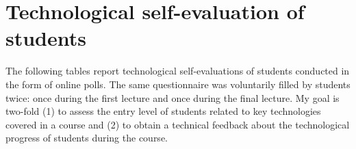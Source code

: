 \chapter{Technological self-evaluation of students}
\label{sec:tech-self-eval}

The following tables report technological self-evaluations of students conducted in the form of online polls. The same questionnaire was voluntarily filled by students twice: once during the first lecture and once during the final lecture. My goal is two-fold (1) to assess the entry level of students related to key technologies covered in a course and (2) to obtain a technical feedback about the technological progress of students during the course. 

